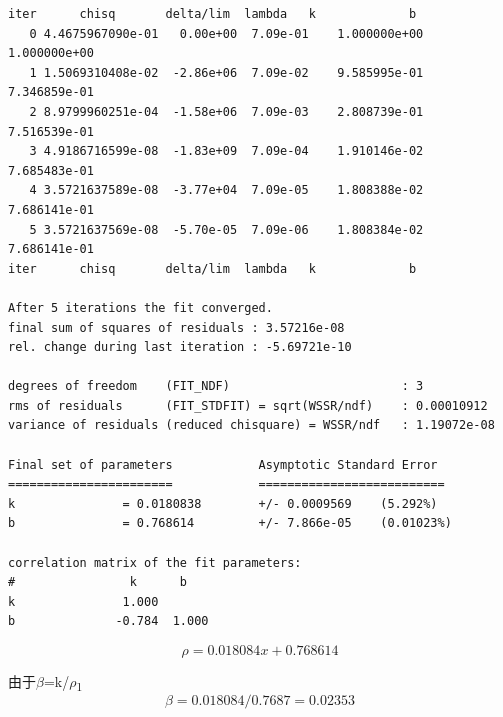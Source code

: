 \documentclass[11pt]{report}
\begin{document}
\begin{verbatim}
iter      chisq       delta/lim  lambda   k             b            
   0 4.4675967090e-01   0.00e+00  7.09e-01    1.000000e+00   1.000000e+00
   1 1.5069310408e-02  -2.86e+06  7.09e-02    9.585995e-01   7.346859e-01
   2 8.9799960251e-04  -1.58e+06  7.09e-03    2.808739e-01   7.516539e-01
   3 4.9186716599e-08  -1.83e+09  7.09e-04    1.910146e-02   7.685483e-01
   4 3.5721637589e-08  -3.77e+04  7.09e-05    1.808388e-02   7.686141e-01
   5 3.5721637569e-08  -5.70e-05  7.09e-06    1.808384e-02   7.686141e-01
iter      chisq       delta/lim  lambda   k             b            

After 5 iterations the fit converged.
final sum of squares of residuals : 3.57216e-08
rel. change during last iteration : -5.69721e-10

degrees of freedom    (FIT_NDF)                        : 3
rms of residuals      (FIT_STDFIT) = sqrt(WSSR/ndf)    : 0.00010912
variance of residuals (reduced chisquare) = WSSR/ndf   : 1.19072e-08

Final set of parameters            Asymptotic Standard Error
=======================            ==========================
k               = 0.0180838        +/- 0.0009569    (5.292%)
b               = 0.768614         +/- 7.866e-05    (0.01023%)

correlation matrix of the fit parameters:
#                k      b      
k               1.000 
b              -0.784  1.000 

\end{verbatim}
\[
\rho=0.018084x+0.768614
\]

由于\(\beta\)=k/\(\rho\)\textsubscript{1}
\[
\beta=0.018084/0.7687=0.02353
\]
\end{document}

